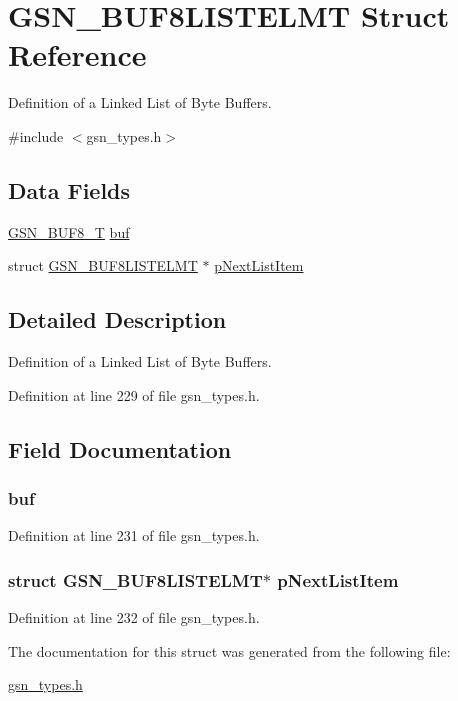 \hypertarget{a00034}{
\section{GSN\_\-BUF8LISTELMT Struct Reference}
\label{a00034}
}


Definition of a Linked List of Byte Buffers.  




{\ttfamily \#include $<$gsn\_\-types.h$>$}

\subsection*{Data Fields}
\begin{DoxyCompactItemize}
\item 
\hyperlink{a00033}{GSN\_\-BUF8\_\-T} \hyperlink{a00034_af14b3d5c301a0f31072ee8856b117347}{buf}
\item 
struct \hyperlink{a00034}{GSN\_\-BUF8LISTELMT} $\ast$ \hyperlink{a00034_a5aecc6c030c5bb9dd387f71e2756ebe0}{pNextListItem}
\end{DoxyCompactItemize}


\subsection{Detailed Description}
Definition of a Linked List of Byte Buffers. 

Definition at line 229 of file gsn\_\-types.h.



\subsection{Field Documentation}
\hypertarget{a00034_af14b3d5c301a0f31072ee8856b117347}{
\subsubsection[{buf}]{ {\bf buf}}}
\label{a00034_af14b3d5c301a0f31072ee8856b117347}


Definition at line 231 of file gsn\_\-types.h.

\hypertarget{a00034_a5aecc6c030c5bb9dd387f71e2756ebe0}{
\subsubsection[{pNextListItem}]{\setlength{\rightskip}{0pt plus 5cm}struct {\bf GSN\_\-BUF8LISTELMT}$\ast$ {\bf pNextListItem}}}
\label{a00034_a5aecc6c030c5bb9dd387f71e2756ebe0}


Definition at line 232 of file gsn\_\-types.h.



The documentation for this struct was generated from the following file:\begin{DoxyCompactItemize}
\item 
\hyperlink{a00599}{gsn\_\-types.h}\end{DoxyCompactItemize}

